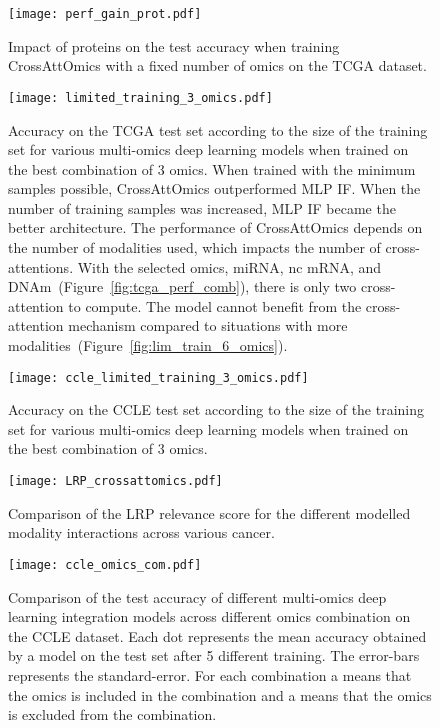  \begin{figure}[htbp]
     \centering
     \texttt{[image: perf\_gain\_prot.pdf]}
     \caption{Impact of proteins on the test accuracy when training CrossAttOmics with a fixed number of omics on the TCGA dataset.}
     \label{fig:perf_gain_prot}
 \end{figure}

 \begin{figure}[htbp]
     \centering
     \texttt{[image: limited\_training\_3\_omics.pdf]}
     \caption{Accuracy on the TCGA test set according to the size of the training set for various multi-omics deep learning models when trained on the best combination of 3 omics. When trained with the minimum samples possible, CrossAttOmics outperformed MLP IF. When the number of training samples was increased, MLP IF became the better architecture. The performance of CrossAttOmics depends on the number of modalities used, which impacts the number of cross-attentions. With the selected omics, miRNA, nc mRNA, and DNAm~(Figure~\ref{fig:tcga_perf_comb}), there is only two cross-attention to compute. The model cannot benefit from the cross-attention mechanism compared to situations with more modalities~(Figure~\ref{fig:lim_train_6_omics}).}
     \label{fig:lim_train_3_omics}
 \end{figure}



 \begin{figure}[htbp]
     \centering
     \texttt{[image: ccle\_limited\_training\_3\_omics.pdf]}
     \caption{Accuracy on the CCLE test set according to the size of the training set for various multi-omics deep learning models when trained on the best combination of 3 omics.}
     \label{fig:ccle_limited_train}
 \end{figure}

 \begin{figure}[htbp]
     \centering
     \texttt{[image: LRP\_crossattomics.pdf]}
     \caption{Comparison of the LRP relevance score for the different modelled modality interactions across various cancer.}
     \label{fig:LRP_CrossAttOmics}
 \end{figure}

 \begin{figure}[htbp]
     \centering
     \texttt{[image: ccle\_omics\_com.pdf]}
     \caption{Comparison of the test accuracy of different multi-omics deep learning integration models across different omics combination on the CCLE dataset. Each dot represents the mean accuracy obtained by a model on the test set after 5 different training. The error-bars represents the standard-error. For each combination a \cmark means that the omics is included in the combination and a \xmark means that the omics is excluded from the combination.}
     \label{fig:ccle_perf_comb}
 \end{figure}

